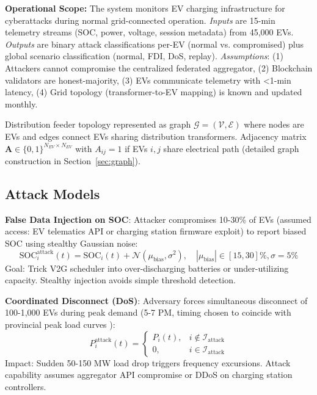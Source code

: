 \documentclass[journal]{IEEEtran}
\begin{document}
\textbf{Operational Scope:} The system monitors EV charging infrastructure for cyberattacks during normal grid-connected operation. \textit{Inputs} are 15-min telemetry streams (SOC, power, voltage, session metadata) from 45,000 EVs. \textit{Outputs} are binary attack classifications per-EV (normal vs. compromised) plus global scenario classification (normal, FDI, DoS, replay). \textit{Assumptions}: (1) Attackers cannot compromise the centralized federated aggregator, (2) Blockchain validators are honest-majority, (3) EVs communicate telemetry with <1-min latency, (4) Grid topology (transformer-to-EV mapping) is known and updated monthly.

Distribution feeder topology represented as graph $\mathcal{G} = (\mathcal{V}, \mathcal{E})$ where nodes are EVs and edges connect EVs sharing distribution transformers. Adjacency matrix $\mathbf{A} \in \{0,1\}^{N_{EV} \times N_{EV}}$ with $A_{ij}=1$ if EVs $i,j$ share electrical path (detailed graph construction in Section~\ref{sec:graph}).

\subsection{Attack Models}

\textbf{False Data Injection on SOC}: Attacker compromises 10-30\% of EVs (assumed access: EV telematics API or charging station firmware exploit) to report biased SOC using stealthy Gaussian noise:
\begin{equation}
\text{SOC}_i^{\text{attack}}(t) = \text{SOC}_i(t) + \mathcal{N}(\mu_{\text{bias}}, \sigma^2), \quad |\mu_{\text{bias}}| \in [15, 30]\%, \sigma=5\%
\end{equation}
Goal: Trick V2G scheduler into over-discharging batteries or under-utilizing capacity. Stealthy injection avoids simple threshold detection.

\textbf{Coordinated Disconnect (DoS)}: Adversary forces simultaneous disconnect of 100-1,000 EVs during peak demand (5-7 PM, timing chosen to coincide with provincial peak load curves \cite{NS2030}):
\begin{equation}
P_i^{\text{attack}}(t) = \begin{cases}
P_i(t), & i \notin \mathcal{I}_{\text{attack}} \\
0, & i \in \mathcal{I}_{\text{attack}}
\end{cases}
\end{equation}
Impact: Sudden 50-150 MW load drop triggers frequency excursions. Attack capability assumes aggregator API compromise or DDoS on charging station controllers.
\end{document}
